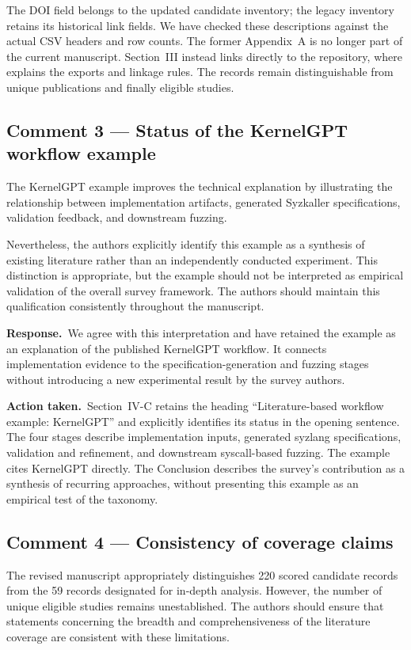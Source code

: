\documentclass[11pt,a4paper]{article}
\newcommand{\response}{\par\textbf{Response.}\ }
\newcommand{\action}{\par\textbf{Action taken.}\ }
\begin{document}
The DOI field belongs to the updated candidate inventory; the legacy inventory retains its historical link fields. We have checked these descriptions against the actual CSV headers and row counts. The former Appendix~A is no longer part of the current manuscript. Section~III instead links directly to the repository, where  explains the exports and linkage rules. The records remain distinguishable from unique publications and finally eligible studies.

\subsection{Comment 3 --- Status of the KernelGPT workflow example}
\begin{reviewcomment}
The KernelGPT example improves the technical explanation by illustrating the relationship between implementation artifacts, generated Syzkaller specifications, validation feedback, and downstream fuzzing.

Nevertheless, the authors explicitly identify this example as a synthesis of existing literature rather than an independently conducted experiment. This distinction is appropriate, but the example should not be interpreted as empirical validation of the overall survey framework. The authors should maintain this qualification consistently throughout the manuscript.
\end{reviewcomment}

\response We agree with this interpretation and have retained the example as an explanation of the published KernelGPT workflow. It connects implementation evidence to the specification-generation and fuzzing stages without introducing a new experimental result by the survey authors.

\action Section~IV-C retains the heading ``Literature-based workflow example: KernelGPT'' and explicitly identifies its status in the opening sentence. The four stages describe implementation inputs, generated syzlang specifications, validation and refinement, and downstream syscall-based fuzzing. The example cites KernelGPT directly. The Conclusion describes the survey's contribution as a synthesis of recurring approaches, without presenting this example as an empirical test of the taxonomy.

\subsection{Comment 4 --- Consistency of coverage claims}
\begin{reviewcomment}
The revised manuscript appropriately distinguishes 220 scored candidate records from the 59 records designated for in-depth analysis. However, the number of unique eligible studies remains unestablished. The authors should ensure that statements concerning the breadth and comprehensiveness of the literature coverage are consistent with these limitations.
\end{reviewcomment}
\end{document}
